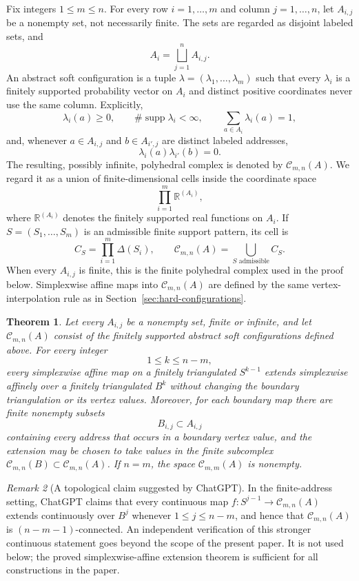 \documentclass[11pt,reqno]{amsart}
\numberwithin{equation}{section}
\newtheorem{theorem}{Theorem}[section]
\theoremstyle{definition}
\theoremstyle{remark}
\newtheorem{remark}[theorem]{Remark}
\newcommand{\supp}{\operatorname{supp}}
\begin{document}
Fix integers $1\le m\le n$.  For every row $i=1,\ldots,m$ and column
$j=1,\ldots,n$, let $A_{i,j}$ be a nonempty set, not necessarily finite.
The sets are regarded as disjoint labeled sets, and
\[
 A_i=\bigsqcup_{j=1}^nA_{i,j}.
\]
An abstract soft configuration is a tuple
$\lambda=(\lambda_1,\ldots,\lambda_m)$ such that every $\lambda_i$ is a
finitely supported probability vector on $A_i$ and distinct positive
coordinates never use the same column.  Explicitly,
\[
 \lambda_i(a)\ge0,
 \qquad
 \#\supp\lambda_i<\infty,
 \qquad
 \sum_{a\in A_i}\lambda_i(a)=1,
\]
and, whenever $a\in A_{i,j}$ and $b\in A_{i',j}$ are distinct labeled
addresses,
\[
 \lambda_i(a)\lambda_{i'}(b)=0.
\]
The resulting, possibly infinite, polyhedral complex is denoted by
$\mathcal C_{m,n}(A)$.  We regard it as a union of finite-dimensional cells
inside the coordinate space
\[
 \prod_{i=1}^m\mathbb R^{(A_i)},
\]
where $\mathbb R^{(A_i)}$ denotes the finitely supported real functions on
$A_i$.  If $S=(S_1,\ldots,S_m)$ is an admissible finite support pattern, its
cell is
\[
 C_S=\prod_{i=1}^m\Delta(S_i),
 \qquad
 \mathcal C_{m,n}(A)=\bigcup_{S\text{ admissible}}C_S.
\]
When every $A_{i,j}$ is finite, this is the finite polyhedral complex used in
the proof below.  Simplexwise affine maps into $\mathcal C_{m,n}(A)$ are
defined by the same vertex-interpolation rule as in Section~\ref{sec:hard-configurations}.

\begin{theorem}\label{thm:soft-filling-strong}
Let every $A_{i,j}$ be a nonempty set, finite or infinite, and let
$\mathcal C_{m,n}(A)$ consist of the finitely supported abstract soft
configurations defined above.  For every integer
\[
 1\le k\le n-m,
\]
every simplexwise affine map on a finitely triangulated $S^{k-1}$ extends
simplexwise affinely over a finitely triangulated $B^k$ without changing the
boundary triangulation or its vertex values.  Moreover, for each boundary
map there are finite nonempty subsets
\[
 B_{i,j}\subset A_{i,j}
\]
containing every address that occurs in a boundary vertex value, and the
extension may be chosen to take values in the finite subcomplex
$\mathcal C_{m,n}(B)\subset\mathcal C_{m,n}(A)$.  If $n=m$, the space
$\mathcal C_{m,m}(A)$ is nonempty.
\end{theorem}

\begin{remark}[A topological claim suggested by ChatGPT]
In the finite-address setting, ChatGPT claims that every continuous map
$f:S^{j-1}\to\mathcal C_{m,n}(A)$ extends continuously over $B^j$ whenever
$1\le j\le n-m$, and hence that $\mathcal C_{m,n}(A)$ is
$(n-m-1)$-connected.  An independent verification of this stronger
continuous statement goes beyond the scope of the present paper.  It is not
used below; the proved simplexwise-affine extension theorem is sufficient
for all constructions in the paper.
\end{remark}
\end{document}
